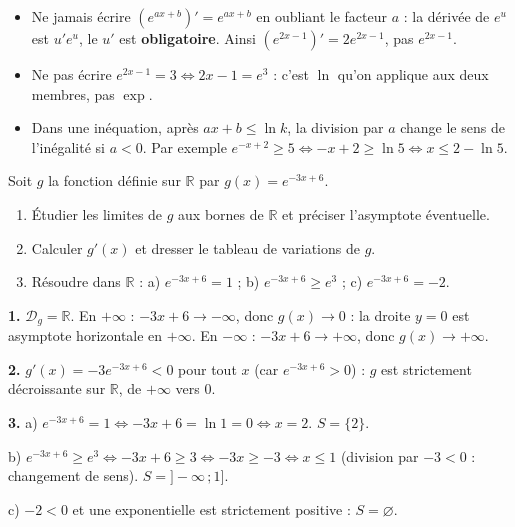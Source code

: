 \documentclass[11pt]{article}
\begin{document}
\begin{attention}
\begin{itemize}
\item Ne jamais écrire $\left(e^{ax+b}\right)' = e^{ax+b}$ en oubliant le facteur $a$ : la dérivée de $e^u$ est $u'e^u$, le $u'$ est \textbf{obligatoire}. Ainsi $\left(e^{2x-1}\right)' = 2e^{2x-1}$, pas $e^{2x-1}$.
\item Ne pas écrire $e^{2x-1} = 3 \iff 2x - 1 = e^3$ : c'est $\ln$ qu'on applique aux deux membres, pas $\exp$.
\item Dans une inéquation, après $ax + b \leq \ln k$, la division par $a$ change le sens de l'inégalité si $a < 0$. Par exemple $e^{-x+2} \geq 5 \iff -x + 2 \geq \ln 5 \iff x \leq 2 - \ln 5$.
\end{itemize}
\end{attention}

\begin{exercice}
Soit $g$ la fonction définie sur $\mathbb{R}$ par $g(x) = e^{-3x+6}$.
\begin{enumerate}
\item Étudier les limites de $g$ aux bornes de $\mathbb{R}$ et préciser l'asymptote éventuelle.
\item Calculer $g'(x)$ et dresser le tableau de variations de $g$.
\item Résoudre dans $\mathbb{R}$ : a) $e^{-3x+6} = 1$ ; b) $e^{-3x+6} \geq e^3$ ; c) $e^{-3x+6} = -2$.
\end{enumerate}
\end{exercice}

\begin{corrige}
\textbf{1.} $\mathcal{D}_g = \mathbb{R}$. En $+\infty$ : $-3x+6 \to -\infty$, donc $g(x) \to 0$ : la droite $y=0$ est asymptote horizontale en $+\infty$. En $-\infty$ : $-3x+6 \to +\infty$, donc $g(x) \to +\infty$.

\textbf{2.} $g'(x) = -3e^{-3x+6} < 0$ pour tout $x$ (car $e^{-3x+6} > 0$) : $g$ est strictement décroissante sur $\mathbb{R}$, de $+\infty$ vers $0$.

\textbf{3.} a) $e^{-3x+6} = 1 \iff -3x+6 = \ln 1 = 0 \iff x = 2$. $S = \{2\}$.

b) $e^{-3x+6} \geq e^3 \iff -3x+6 \geq 3 \iff -3x \geq -3 \iff x \leq 1$ (division par $-3 < 0$ : changement de sens). $S = ]-\infty\,;1]$.

c) $-2 < 0$ et une exponentielle est strictement positive : $S = \varnothing$.
\end{corrige}
\end{document}
